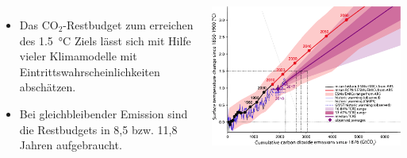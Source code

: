 \begin{frame}
    \begin{columns}
        \begin{itemize}
          \item Das CO$_2$-Restbudget zum erreichen des \SI{1.5}{\degreeCelsius} Ziels lässt sich mit Hilfe vieler Klimamodelle mit Eintrittswahrscheinlichkeiten abschätzen.
          \item Bei gleichbleibender Emission sind die Restbudgets in 8,5 bzw. 11,8 Jahren aufgebraucht.
        \end{itemize}
        \includegraphics[width=0.9\linewidth]{bilder/cumulative_co2/cumulative_co2-4.pdf}
    \end{columns}

	\note{
	\begin{itemize}
		\item[] 
	\end{itemize}
	}
\end{frame}
